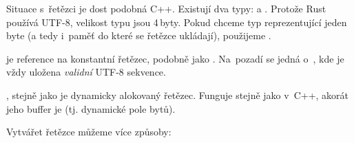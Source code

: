 \documentclass[main.tex]{subfiles}
\begin{document}


Situace s~řetězci je dost podobná C++. Existují dva typy:  a .
Protože Rust používá UTF-8, velikost typu  jsou 4\,byty. Pokud chceme typ
reprezentující jeden byte (a tedy i~paměť do které se řetězce ukládají), použijeme
.

 je reference na konstantní řetězec, podobně jako .
Na~pozadí se jedná o~\irust{&[u8]}, kde je vždy uložena \emph{validní} UTF-8 sekvence.

, stejně jako  je dynamicky alokovaný řetězec. Funguje
stejně jako v~C++, akorát jeho buffer je  (tj. dynamické pole bytů).

Vytvářet řetězce můžeme více způsoby:

\obrazek


\end{document}
